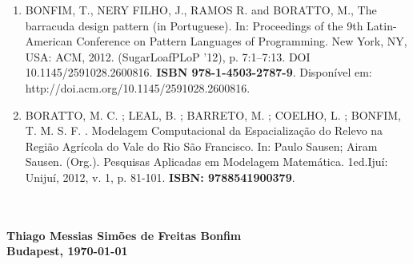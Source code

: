 \documentclass[10pt]{article}
\begin{document}
\begin{itemize}
\begin{enumerate}
		\item BONFIM, T., NERY FILHO, J., RAMOS R. and BORATTO, M., The barracuda design pattern (in Portuguese). In: Proceedings of the 9th Latin-American Conference on Pattern Languages of Programming. New York, NY, USA: ACM, 2012. (SugarLoafPLoP '12), p. 7:1--7:13. DOI 10.1145/2591028.2600816. \textbf{ISBN 978-1-4503-2787-9}. Disponível em:\\ http://doi.acm.org/10.1145/2591028.2600816.
		
		\item BORATTO, M. C. ; LEAL, B. ; BARRETO, M. ; COELHO, L. ; BONFIM, T. M. S. F. . Modelagem Computacional da Espacialização do Relevo na Região Agrícola do Vale do Rio São Francisco. In: Paulo Sausen; Airam Sausen. (Org.). Pesquisas Aplicadas em Modelagem Matemática. 1ed.Ijuí: Unijuí, 2012, v. 1, p. 81-101. \textbf{ISBN: 9788541900379}.

	\end{enumerate}

\end{itemize}


\begin{flushright}
\textbf{
	\\~\\
	\noindent
	Thiago Messias Simões de Freitas Bonfim\\
	Budapest, \today
}
\end{flushright}
\end{document}

